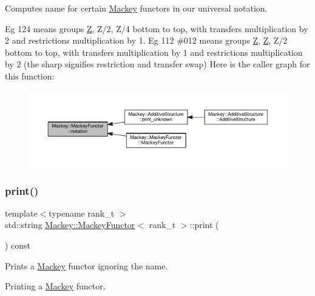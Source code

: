 Computes name for certain \hyperlink{namespaceMackey}{Mackey} functors in our universal notation. 

Eg 124 means groups \hyperlink{classZ}{Z}, Z/2, Z/4 bottom to top, with transfers multiplication by 2 and restrictions multiplication by 1. Eg 112 \#012 means groups \hyperlink{classZ}{Z}, \hyperlink{classZ}{Z}, Z/2 bottom to top, with transfers multiplication by 1 and restrictions multiplication by 2 (the sharp signifies restriction and transfer swap) Here is the caller graph for this function\+:\nopagebreak
\begin{figure}[H]
\begin{center}
\leavevmode
\includegraphics[width=350pt]{classMackey_1_1MackeyFunctor_a2b333a786e44000c96ffd087a81a1d17_icgraph}
\end{center}
\end{figure}
\mbox{\label{classMackey_1_1MackeyFunctor_a3f694cd4f0a234be4531c21771772b50}} 
\subsubsection{\texorpdfstring{print()}{print()}}
{\footnotesize\ttfamily template$<$typename rank\+\_\+t $>$ \\
std\+::string \hyperlink{classMackey_1_1MackeyFunctor}{Mackey\+::\+Mackey\+Functor}$<$ rank\+\_\+t $>$\+::print (\begin{DoxyParamCaption}{ }\end{DoxyParamCaption}) const}



Prints a \hyperlink{namespaceMackey}{Mackey} functor ignoring the name. 

Printing a \hyperlink{namespaceMackey}{Mackey} functor. \mbox{\label{classMackey_1_1MackeyFunctor_a44d3104a47f23de5d8141b7800db6d11}} 
